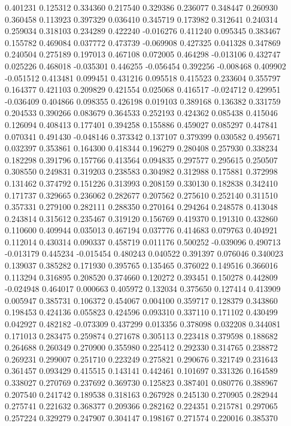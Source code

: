 0.401231
0.125312
0.334360
0.217540
0.329386
0.236077
0.348447
0.260930
0.360458
0.113923
0.397329
0.036410
0.345719
0.173982
0.312641
0.240314
0.259034
0.318103
0.234289
0.422240
-0.016276
0.411240
0.095345
0.383467
0.155782
0.469084
0.037772
0.473739
-0.069908
0.427325
0.041328
0.347869
0.240504
0.275189
0.197013
0.467108
0.072005
0.464298
-0.013106
0.432747
0.025226
0.468018
-0.035301
0.446255
-0.056454
0.392256
-0.008468
0.409902
-0.051512
0.413481
0.099451
0.431216
0.095518
0.415523
0.233604
0.355797
0.164377
0.421103
0.209829
0.421554
0.025068
0.416517
-0.024712
0.429951
-0.036409
0.404866
0.098355
0.426198
0.019103
0.389168
0.136382
0.331759
0.204533
0.390266
0.083679
0.364533
0.252193
0.424362
0.085438
0.415046
0.126094
0.408413
0.177401
0.394258
0.155886
0.459027
0.085297
0.447841
0.070341
0.491430
-0.048146
0.373342
0.137107
0.379399
0.030582
0.495671
0.032397
0.353861
0.164300
0.418344
0.196279
0.280408
0.257930
0.338234
0.182298
0.391796
0.157766
0.413564
0.094835
0.297577
0.295615
0.250507
0.308550
0.249831
0.319203
0.238583
0.304982
0.312988
0.175881
0.372998
0.131462
0.374792
0.151226
0.313993
0.208159
0.330130
0.182838
0.342410
0.171737
0.329665
0.236062
0.282677
0.207562
0.275610
0.252140
0.311510
0.357331
0.279100
0.282111
0.288350
0.270164
0.294264
0.248578
0.413048
0.243814
0.315612
0.235467
0.319120
0.156769
0.419370
0.191310
0.432860
0.110600
0.409944
0.035013
0.467194
0.037776
0.414683
0.079763
0.404921
0.112014
0.430314
0.090337
0.458719
0.011176
0.500252
-0.039096
0.490713
-0.013179
0.445234
-0.015454
0.480243
0.040522
0.391397
0.076046
0.340023
0.139037
0.385282
0.171930
0.395765
0.135465
0.376022
0.149516
0.366016
0.113294
0.316895
0.208520
0.374660
0.120272
0.393451
0.150278
0.442809
-0.024948
0.464017
0.000663
0.405972
0.132034
0.375650
0.127414
0.413909
0.005947
0.385731
0.106372
0.454067
0.004100
0.359717
0.128379
0.343860
0.198453
0.424136
0.055823
0.424596
0.093310
0.337110
0.171102
0.430499
0.042927
0.482182
-0.073309
0.437299
0.013356
0.378098
0.032208
0.344081
0.171013
0.283475
0.259874
0.271678
0.305113
0.223418
0.379598
0.188682
0.264688
0.260349
0.270900
0.355980
0.225412
0.292330
0.314765
0.238872
0.269231
0.299007
0.251710
0.223249
0.275821
0.290676
0.321749
0.231643
0.361457
0.093429
0.415515
0.143141
0.442461
0.101697
0.331326
0.164589
0.338027
0.270769
0.237692
0.369730
0.125823
0.387401
0.080776
0.388967
0.207540
0.241742
0.189538
0.318163
0.267928
0.245130
0.270905
0.282944
0.275741
0.221632
0.368377
0.209366
0.282162
0.224351
0.215781
0.297065
0.257224
0.329279
0.247907
0.304147
0.198167
0.271574
0.220016
0.385370
